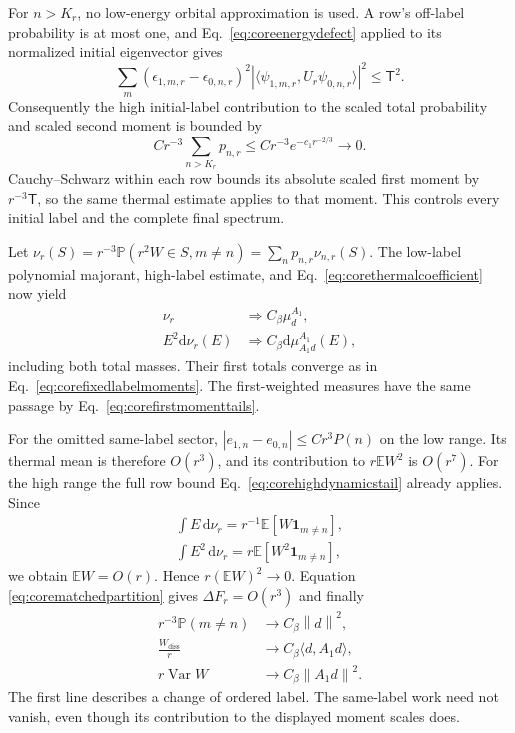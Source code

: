\documentclass[aps,pra,reprint,superscriptaddress,longbibliography]{revtex4-2}
\newcommand{\dd}{\mathrm d}
\newcommand{\Var}{\operatorname{Var}}
\newcommand{\Wd}{W_{\mathrm{diss}}}
\newcommand{\E}{\mathbb E}
\newcommand{\Prob}{\mathbb P}
\newcommand{\norm}[1]{\left\lVert#1\right\rVert}
\begin{document}
For $n>K_r$, no low-energy orbital approximation is used. A row's
off-label probability is at most one, and
Eq.~\eqref{eq:coreenergydefect} applied to its normalized initial
eigenvector gives
\begin{equation}
 \sum_m(\epsilon_{1,m,r}-\epsilon_{0,n,r})^2
 |\langle\psi_{1,m,r},U_r\psi_{0,n,r}\rangle|^2
       \le\mathsf T^2.
 \label{eq:coreallindexenergy}
\end{equation}
Consequently the high initial-label contribution to the scaled total
probability and scaled second moment is bounded by
\begin{equation}
 Cr^{-3}\sum_{n>K_r}p_{n,r}
       \le Cr^{-3}e^{-c_1r^{-2/3}}\longrightarrow0.
 \label{eq:corehighdynamicstail}
\end{equation}
Cauchy--Schwarz within each row bounds its absolute scaled first moment
by $r^{-3}\mathsf T$, so the same thermal estimate applies to that
moment. This controls every initial label and the complete final
spectrum.

Let
$\nu_r(S)=r^{-3}\Prob(r^2W\in S,m\ne n)=\sum_np_{n,r}\nu_{n,r}(S)$.
The low-label polynomial majorant, high-label estimate, and
Eq.~\eqref{eq:corethermalcoefficient} now yield
\begin{align}
 \nu_r&\Longrightarrow C_\beta\mu_d^{A_1},\nonumber\\
 E^2\dd\nu_r(E)&\Longrightarrow C_\beta\dd\mu_{A_1d}^{A_1}(E),
 \label{eq:corefullmeasure}
\end{align}
including both total masses. Their first totals converge as in
Eq.~\eqref{eq:corefixedlabelmoments}. The first-weighted measures have
the same passage by Eq.~\eqref{eq:corefirstmomenttails}.

For the omitted same-label sector,
$|e_{1,n}-e_{0,n}|\le Cr^3P(n)$ on the low range. Its thermal mean is
therefore $O(r^3)$, and its contribution to $r\E W^2$ is $O(r^7)$.
For the high range the full row bound
Eq.~\eqref{eq:corehighdynamicstail} already applies. Since
\begin{equation}
 \begin{gathered}
 \int E\,\dd\nu_r
       =r^{-1}\E[W\mathbf1_{m\ne n}],\\
 \int E^2\,\dd\nu_r
        =r\E[W^2\mathbf1_{m\ne n}],
 \end{gathered}
 \label{eq:corephysicalmoments}
\end{equation}
we obtain $\E W=O(r)$. Hence $r(\E W)^2\to0$. Equation
\eqref{eq:corematchedpartition} gives $\Delta F_r=O(r^3)$ and finally
\begin{align}
 r^{-3}\Prob(m\ne n)&\longrightarrow C_\beta\norm d^2,\nonumber\\
 \frac{\Wd}{r}&\longrightarrow C_\beta\langle d,A_1d\rangle,\nonumber\\
 r\Var W&\longrightarrow C_\beta\norm{A_1d}^2.
 \label{eq:corefullmoments}
\end{align}
The first line describes a change of ordered label. The same-label work
need not vanish, even though its contribution to the displayed moment
scales does.
\end{document}
